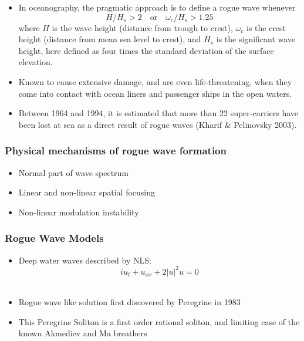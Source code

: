 \documentclass{beamer}
\def\b{\begin}
\def\e{\end}
\theoremstyle{plain}
\theoremstyle{definition}
\begin{document}
\frame
{
\b{itemize}
\item In oceanography, the pragmatic approach is to 
define a rogue wave whenever
\begin{equation*}\tag{1.1}
H/H_s>2\quad\text{or}\quad\omega_c/H_s>1.25
\e{equation*}
where $H$ is the wave height (distance from trough to crest), $\omega_c$ is the crest height (distance from mean sea level to crest), and $H_s$ is the significant wave height, here defined as four times the standard deviation of the surface elevation.

\pause
\item Known to cause extensive damage, and are even life-threatening, when they come into contact with ocean liners and passenger ships in the open waters.  

\pause
\item Between 1964 and 1994, it is estimated that more than 22 super-carriers have been lost at sea as a direct result of rogue waves (Kharif \& Pelinovsky 2003).
\e{itemize}
}

\frame
{
\frametitle{Physical mechanisms of rogue wave formation}
\b{itemize}

\item Normal part of wave spectrum\\[25pt]

\pause
\item Linear and non-linear spatial focusing\\[25pt]

\pause
\item Non-linear modulation instability

\e{itemize}
}

\frame
{
\frametitle{Rogue Wave Models}
\b{itemize}
\item Deep water waves described by NLS: $$iu_t + u_{xx} + 2|u|^2u = 0$$\\[5pt]

\pause
\item Rogue wave like solution first discovered by Peregrine in 1983\\[25pt]

\pause
\item This Peregrine Soliton is a first order rational soliton, and limiting case of the known Akmediev and Ma breathers

\e{itemize}
}
\end{document}

